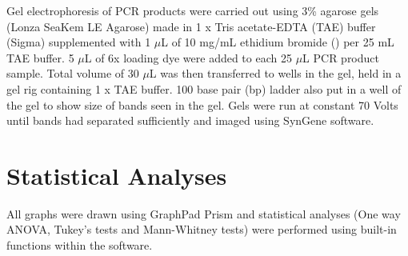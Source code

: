 Gel electrophoresis of PCR products were carried out using 3\% agarose gels (Lonza SeaKem LE Agarose) made in 1 x Tris acetate-EDTA (TAE) buffer (Sigma) supplemented with 1 $\mu$L of 10 mg/mL ethidium bromide () per 25 mL TAE buffer.
5 $\mu$L of 6x loading dye  were added to each 25 $\mu$L PCR product sample.
Total volume of 30 $\mu$L was then transferred to wells in the gel, held in a gel rig containing 1 x TAE buffer.
100 base pair (bp) ladder also put in a well of the gel to show size of bands seen in the gel.
Gels were run at constant 70 Volts until bands had separated sufficiently and imaged using SynGene software.

\section{Statistical Analyses}

All graphs were drawn using GraphPad Prism and statistical analyses (One way ANOVA, Tukey's tests and Mann-Whitney tests) were performed using built-in functions within the software.
